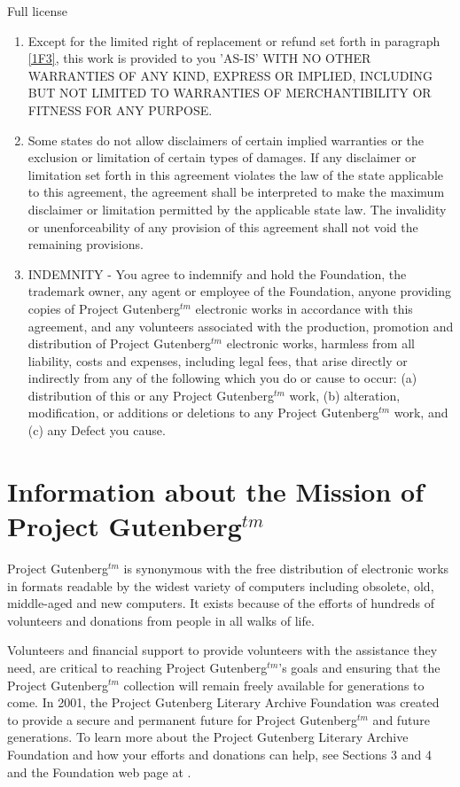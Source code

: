 \begin{chapter}{Full license}
\begin{enumerate}
\begin{enumerate}
\item Except for the limited right of replacement or refund set forth
in paragraph \ref{1F3}, this work is provided to you 'AS-IS' WITH NO OTHER
WARRANTIES OF ANY KIND, EXPRESS OR IMPLIED, INCLUDING BUT NOT LIMITED TO
WARRANTIES OF MERCHANTIBILITY OR FITNESS FOR ANY PURPOSE.

\item Some states do not allow disclaimers of certain implied
warranties or the exclusion or limitation of certain types of damages.
If any disclaimer or limitation set forth in this agreement violates the
law of the state applicable to this agreement, the agreement shall be
interpreted to make the maximum disclaimer or limitation permitted by
the applicable state law.  The invalidity or unenforceability of any
provision of this agreement shall not void the remaining provisions.

\item INDEMNITY - You agree to indemnify and hold the Foundation, the
trademark owner, any agent or employee of the Foundation, anyone
providing copies of Project Gutenberg$^{tm}$ electronic works in accordance
with this agreement, and any volunteers associated with the production,
promotion and distribution of Project Gutenberg$^{tm}$ electronic works,
harmless from all liability, costs and expenses, including legal fees,
that arise directly or indirectly from any of the following which you do
or cause to occur: (a) distribution of this or any Project Gutenberg$^{tm}$
work, (b) alteration, modification, or additions or deletions to any
Project Gutenberg$^{tm}$ work, and (c) any Defect you cause.
\end{enumerate}

\end{enumerate}

\section[]{Information about the Mission of Project
Gutenberg$^{tm}$}

Project Gutenberg$^{tm}$ is synonymous with the free distribution of
electronic works in formats readable by the widest variety of computers
including obsolete, old, middle-aged and new computers.  It exists
because of the efforts of hundreds of volunteers and donations from
people in all walks of life.

Volunteers and financial support to provide volunteers with the
assistance they need, are critical to reaching Project Gutenberg$^{tm}$'s
goals and ensuring that the Project Gutenberg$^{tm}$ collection will
remain freely available for generations to come.  In 2001, the Project
Gutenberg Literary Archive Foundation was created to provide a secure
and permanent future for Project Gutenberg$^{tm}$ and future generations.
To learn more about the Project Gutenberg Literary Archive Foundation
and how your efforts and donations can help, see Sections 3 and 4
and the Foundation web page at
.



\end{chapter}
